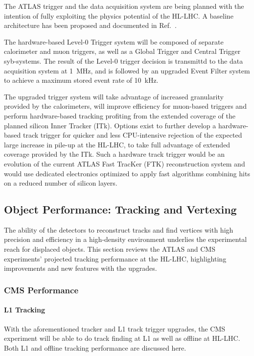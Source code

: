 The ATLAS trigger and the data acquisition system are being planned with the intention of fully exploiting the physics potential of the HL-LHC. A baseline architecture has been proposed and documented in Ref.~\cite{Collaboration:2285584}. 

The hardware-based Level-0 Trigger system will be composed of separate calorimeter and muon triggers, as well as a Global Trigger and Central Trigger syb-systems.  The result of the Level-0 trigger decision is transmittd to the data acquisition system at 1~MHz, and is followed by an upgraded Event Filter system to achieve a maximum stored event rate of 10~kHz.

The upgraded trigger system will take advantage of increased granularity provided by the calorimeters, will improve efficiency for muon-based triggers and perform hardware-based tracking profiting from the extended coverage of the planned silicon Inner Tracker (ITk).  Options exist to further develop a hardware-based track trigger for quicker and less CPU-intensive rejection of the expected large increase in pile-up at the HL-LHC, to take full advantage of extended coverage provided by the ITk.  Such a hardware track trigger would be an evolution of the current ATLAS Fast TracKer (FTK) reconstruction system and would use dedicated electronics optimized to apply fast algorithms combining hits on a reduced number of silicon layers.

\subsection{Object Performance: Tracking and Vertexing} \label{sec:upgradeobject}

The ability of the detectors to reconstruct tracks and find vertices with high precision and efficiency in a high-density environment underlies the experimental reach for displaced objects. This section reviews the ATLAS and CMS experiments' projected tracking performance at the HL-LHC, highlighting improvements and new features with the upgrades.

\subsubsection{CMS Performance}

\paragraph{L1 Tracking}

With the aforementioned tracker and L1 track trigger upgrades, the CMS experiment will be able to do track finding at L1 as well as offline at HL-LHC. Both L1 and offline tracking performance are discussed here.

